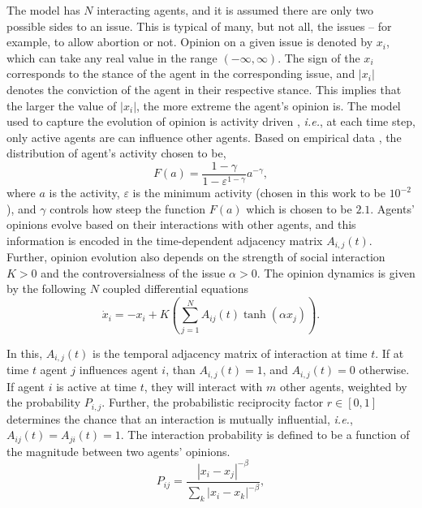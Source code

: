 The model has $N$ interacting agents, and it is assumed there are only two possible sides to an issue. This is typical of many, but not all, the issues -- for example, to allow abortion or not. Opinion on a given issue is denoted by $x_i$, which can take any real value in the range $(-\infty, \infty)$. The sign of the $x_i$ corresponds to the stance of the agent in the corresponding issue, and $|x_i|$ denotes the conviction of the agent in their respective stance. This implies that the larger the value of $|x_i|$, the more extreme the agent's opinion is. The model used to capture the evolution of opinion is activity driven \cite{activity-driven-modeling-of-time-varying-networks, topological-properties-of-time-integrated-activity-driven-netowork, burstiness-and-aging-in-social-temporal-networks, controlling-contagion-processes-in-activity-driven-networks}, {\it i.e.}, at each time step, only active agents are can influence other agents. Based on empirical data \cite{activity-driven-modeling-of-time-varying-networks, burstiness-and-aging-in-social-temporal-networks}, the distribution of agent's activity chosen to be,
\begin{equation}
    \label{activities.eq}
      F(a) = \frac{1-\gamma}{1-\varepsilon^{1-\gamma}} a^{-\gamma},
\end{equation}
where $a$ is the activity, $\varepsilon$ is the minimum activity (chosen in this work to be $10^{-2}$), and $\gamma$ controls how steep the function $F(a)$ which is chosen to be $2.1$. Agents' opinions evolve based on their interactions with other agents, and this information is encoded in the time-dependent adjacency matrix $A_{i, j}(t)$. Further, opinion evolution also depends on the strength of social interaction $K > 0$ and the controversialness of the issue $\alpha > 0$. The opinion dynamics is given by 
the following $N$ coupled differential equations \cite{modeling-echo-chambers-and-polarizaiton-dynamics-in-social-networks}
\begin{equation}
    \label{main.eq}
    \dot{x}_i= -x_i + K \left(\sum^{N}_{j=1} A_{ij} (t)  \tanh{(\alpha x_j)}\right).
\end{equation}

In this, $A_{i, j}(t)$ is the temporal adjacency matrix of interaction at time $t$. If at time $t$ agent $j$ influences agent $i$, than $A_{i, j}(t) = 1$, and $A_{i, j}(t) = 0$ otherwise. If agent $i$ is active at time $t$, they will interact with $m$ other agents, weighted by the probability $P_{i, j}$. Further, the probabilistic reciprocity factor $r \in [0, 1]$ determines the chance that an interaction is mutually influential, {\it i.e.}, $A_{ij}(t)=A_{ji}(t)=1$. The interaction probability is defined to be a function of the magnitude between two agents' opinions.
\begin{equation}
    \label{homophily.eq}
    {P_{ij} = \frac{|x_i - x_j|^{-\beta}}{\sum_k{|x_i - x_k|^{-\beta}}}},
\end{equation}

